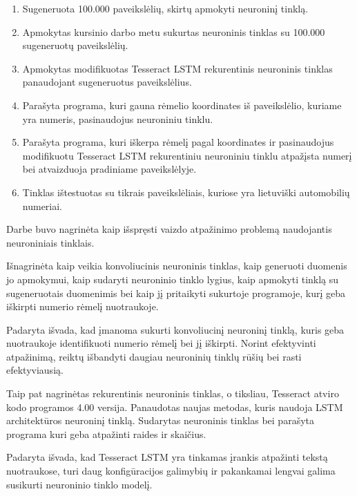 \documentclass{VUMIFInfBakalaurinis}
\begin{document}
\pagebreak
{}
\begin{enumerate}%
  \item Sugeneruota 100.000 paveikslėlių, skirtų apmokyti neuroninį tinklą.
  \item Apmokytas kursinio darbo metu sukurtas neuroninis tinklas su 100.000 sugeneruotų paveikslėlių.
  \item Apmokytas modifikuotas Tesseract LSTM rekurentinis neuroninis tinklas panaudojant sugeneruotus paveikslėlius.
  \item Parašyta programa, kuri gauna rėmelio koordinates iš paveikslėlio, kuriame yra numeris, pasinaudojus neuroniniu tinklu.
  \item Parašyta programa, kuri iškerpa rėmelį pagal koordinates ir pasinaudojus modifikuotu Tesseract LSTM rekurentiniu neuroniniu tinklu atpažįsta numerį bei atvaizduoja pradiniame paveikslėlyje.
  \item Tinklas ištestuotas su tikrais paveikslėliais, kuriose yra lietuviški automobilių numeriai.
\end{enumerate}

Darbe buvo nagrinėta kaip išspręsti vaizdo atpažinimo problemą naudojantis neuroniniais tinklais.

Išnagrinėta kaip veikia konvoliucinis neuroninis tinklas, kaip generuoti duomenis jo apmokymui,
kaip sudaryti neuroninio tinklo lygius, kaip apmokyti tinklą su sugeneruotais duomenimis bei kaip
jį pritaikyti sukurtoje programoje, kurį geba iškirpti numerio rėmelį nuotraukoje.

Padaryta išvada, kad įmanoma sukurti konvoliucinį neuroninį tinklą, kuris geba nuotraukoje
identifikuoti numerio rėmelį bei jį iškirpti. Norint efektyvinti atpažinimą, reiktų išbandyti 
daugiau neuroninių tinklų rūšių bei rasti efektyviausią.

Taip pat nagrinėtas rekurentinis neuroninis tinklas, o tiksliau, Tesseract atviro kodo 
programos 4.00 versija. Panaudotas naujas metodas, kuris naudoja LSTM architektūros
neuroninį tinklą. Sudarytas neuroninis tinklas bei parašyta programa kuri geba 
atpažinti raides ir skaičius.

Padaryta išvada, kad Tesseract LSTM yra tinkamas įrankis atpažinti tekstą nuotraukose,
turi daug konfigūracijos galimybių ir pakankamai lengvai galima susikurti neuroninio
tinklo modelį.
\pagebreak
\printbibliography[heading=bibintoc]
\end{document}
